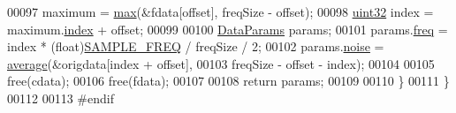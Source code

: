 \begin{DoxyCode}
00097         maximum = \hyperlink{namespacevaso_a122846d728be312454a452d379915e10}{max}(&fdata[offset], freqSize - offset);
00098         \hyperlink{definitions_8hpp_a1134b580f8da4de94ca6b1de4d37975e}{uint32} index = maximum.\hyperlink{structMaximum_a2e6aef03795cd285fe542d0861c6e3b5}{index} + offset;
00099         
00100         \hyperlink{structDataParams}{DataParams} params;
00101         params.\hyperlink{structDataParams_a12566e017407647bc8287d62554ad3fb}{freq} = index * (float)\hyperlink{definitions_8hpp_a8ace559345ecba7978591ac2ef22aea4}{SAMPLE\_FREQ} / freqSize / 2;
00102         params.\hyperlink{structDataParams_a4efd1d2231c6fa7c878c9d5e1650738f}{noise} = \hyperlink{namespacevaso_ad3205136b1cd04b4c6b9d7be73661796}{average}(&origdata[index + offset],
00103                 freqSize - offset - index);
00104 
00105         free(cdata);
00106         free(fdata);
00107 
00108         \textcolor{keywordflow}{return} params;
00109 
00110     \}
00111 \}
00112 
00113 \textcolor{preprocessor}{#endif}
\end{DoxyCode}
